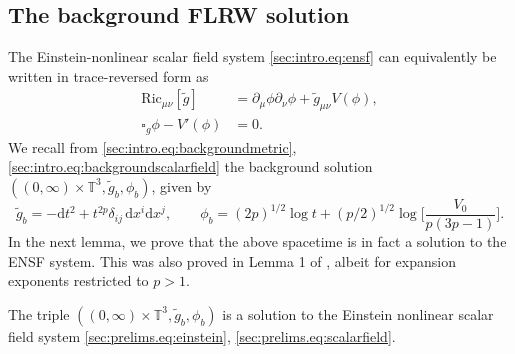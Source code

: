 \documentclass{article}
\newcommand{\TT}{\mathbb{T}}
\newcommand{\Ric}{\mathrm{Ric}}
\newcommand{\de}{\mathrm{d}}
\newcommand{\wt}{\widetilde}
\newcommand{\pa}{\partial}
\begin{document}
\subsection{The background FLRW solution}\label{sec:prelims.subsec:FLRW}
The Einstein-nonlinear scalar field system \eqref{sec:intro.eq:ensf} can equivalently be written in trace-reversed form as
\begin{subequations}
    \begin{align}
    \Ric_{\mu\nu}[\wt{g}] &= \pa_\mu \phi \pa_\nu \phi + \wt{g}_{\mu\nu}V(\phi),\label{sec:prelims.eq:einstein}\\
    \square_g \phi - V'(\phi)&=0.\label{sec:prelims.eq:scalarfield}
\end{align}
\end{subequations}
We recall from \eqref{sec:intro.eq:backgroundmetric}, \eqref{sec:intro.eq:backgroundscalarfield} the background solution $((0,\infty)\times\TT^3,\wt{g}_b,\phi_b)$, given by
\begin{equation}
    \wt{g}_b = -\de t^2 + t^{2p} \delta_{ij}\,\de x^i \de x^j,\qquad 
        \phi_b = (2p)^{1/2} \log t + (p/2)^{1/2}\log\Big[\frac{V_0}{p(3p-1)}\Big].
\end{equation}
In the next lemma, we prove that the above spacetime is in fact a solution to the ENSF system. This was also proved in Lemma 1 of \cite{Rin:powerlaw:09}, albeit for expansion exponents restricted to $p > 1$.
\begin{lemma}\label{sec:prelims.lem:background}
    The triple $((0,\infty)\times \TT^3,\wt{g}_b,\phi_b)$ is a solution to the Einstein nonlinear scalar field system \eqref{sec:prelims.eq:einstein}, \eqref{sec:prelims.eq:scalarfield}.
\end{lemma}
\end{document}
